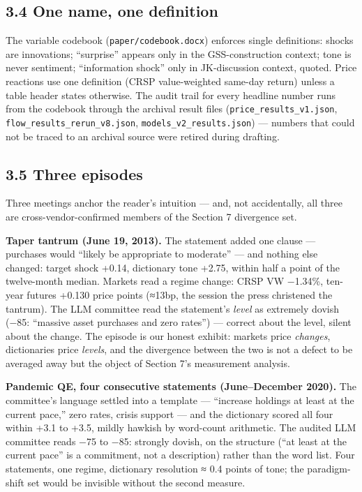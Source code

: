 \subsection{3.4 One name, one definition}\label{one-name-one-definition}

The variable codebook (\texttt{paper/codebook.docx}) enforces single definitions: shocks are innovations; ``surprise'' appears only in the GSS-construction context; tone is never sentiment; ``information shock'' only in JK-discussion context, quoted. Price reactions use one definition (CRSP value-weighted same-day return) unless a table header states otherwise. The audit trail for every headline number runs from the codebook through the archival result files (\texttt{price\_results\_v1.json}, \texttt{flow\_results\_rerun\_v8.json}, \texttt{models\_v2\_results.json}) --- numbers that could not be traced to an archival source were retired during drafting.

\subsection{3.5 Three episodes}\label{three-episodes}

Three meetings anchor the reader's intuition --- and, not accidentally, all three are cross-vendor-confirmed members of the Section 7 divergence set.

\textbf{Taper tantrum (June 19, 2013).} The statement added one clause --- purchases would ``likely be appropriate to moderate'' --- and nothing else changed: target shock +0.14, dictionary tone +2.75, within half a point of the twelve-month median. Markets read a regime change: CRSP VW −1.34\%, ten-year futures +0.130 price points (≈13bp, the session the press christened the tantrum). The LLM committee read the statement's \emph{level} as extremely dovish (−85: ``massive asset purchases and zero rates'') --- correct about the level, silent about the change. The episode is our honest exhibit: markets price \emph{changes}, dictionaries price \emph{levels}, and the divergence between the two is not a defect to be averaged away but the object of Section 7's measurement analysis.

\textbf{Pandemic QE, four consecutive statements (June--December 2020).} The committee's language settled into a template --- ``increase holdings at least at the current pace,'' zero rates, crisis support --- and the dictionary scored all four within +3.1 to +3.5, mildly hawkish by word-count arithmetic. The audited LLM committee reads −75 to −85: strongly dovish, on the structure (``at least at the current pace'' is a commitment, not a description) rather than the word list. Four statements, one regime, dictionary resolution ≈ 0.4 points of tone; the paradigm-shift set would be invisible without the second measure.

